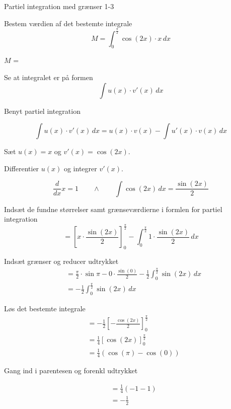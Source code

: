 \documentclass{article}
\begin{document}
\begin{exercise}{Partiel integration med grænser 1-3}
	
	Bestem værdien af det bestemte integrale
	\[
	M = \int_0^{\frac{\pi}{2}} \cos(2x) \cdot x \, dx
	\]
	
	$M$ =  \\
	
	
	\hint
	
	Se at integralet er på formen
	\[
	\int u(x) \cdot v'(x) \, dx
	\]
	
	\hint
	
	Benyt partiel integration
	
	\hint
	\[
	\int u(x) \cdot v'(x)\, dx = u(x) \cdot v(x) - \int u'(x) \cdot v(x) \, dx
	\]
	\hint
	
	Sæt $u(x) = x$ og $v'(x) = \cos(2x)$.
	
	
	\hint
	
	Differentier $u(x)$ og integrer $v'(x)$.
	
	\hint
	\[
	\frac{d}{dx}x = 1 \qquad \wedge \qquad \int \cos(2x) \, dx = \frac{\sin(2x)}{2}
	\]
	
	\hint
	
	Indsæt de fundne størrelser samt grænseværdierne i formlen for partiel integration 
	\[
	= \left[x \cdot \frac{\sin(2x)}{2}\right]_{0}^{\frac{\pi}{2}} - \int_{0}^{\frac{\pi}{2}} 1 \cdot \frac{\sin(2x)}{2} \, dx
	\]
	
	\hint
	
	Indsæt grænser og reducer udtrykket
	\begin{align*}
	&=  \frac{\pi}{2} \cdot \sin{\pi} - 0 \cdot \frac{\sin(0)}{2}  - \frac{1}{2} \int_{0}^{\frac{\pi}{2}} \sin(2x)  \, dx  \\
	& = - \frac{1}{2} \int_{0}^{\frac{\pi}{2}} \sin(2x)  \, dx
	\end{align*}
	
	\hint
	Løs det bestemte integrale
	\begin{align*}
	&= - \frac{1}{2} \left[ - \frac{\cos(2x)}{2}  \right]_{0}^{\frac{\pi}{2}} \\
	&= \frac{1}{4} \left[ \cos(2x) \right]_{0}^{\frac{\pi}{2}} \\
	&= \frac{1}{4} \left( \cos(\pi) - \cos(0) \right) 
	\end{align*}
	
	\hint
	Gang ind i parentesen og forenkl udtrykket
	
	\hint
	\begin{align*}
	&= \frac{1}{4} (-1 -1) \\
	&= - \frac{1}{2}
	\end{align*}
	
	
	
\end{exercise}
\end{document}
